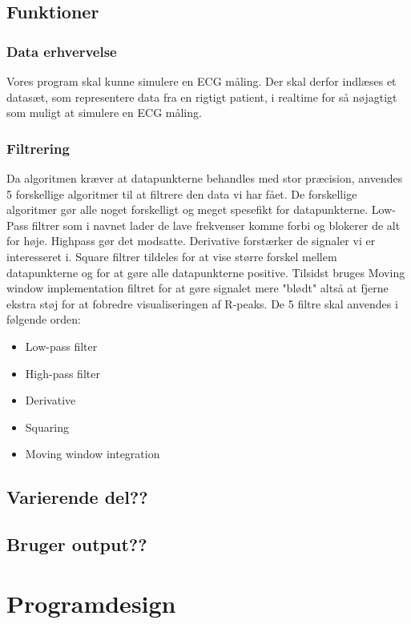 \documentclass[a4paper,12pt]{article}
\begin{document}
\subsection{Funktioner}
\subsubsection{Data erhvervelse}
Vores program skal kunne simulere en ECG måling. Der skal derfor indlæses et datasæt, som representere data fra en rigtigt patient, i realtime for så nøjagtigt som muligt at simulere en ECG måling.  
\subsubsection{Filtrering}
Da algoritmen kræver at datapunkterne behandles med stor præcision, anvendes 5 forskellige algoritmer til at filtrere den data vi har fået. De forskellige algoritmer gør alle noget forskelligt og meget spesefikt for datapunkterne. Low-Pass filtrer som i navnet lader de lave frekvenser komme forbi og blokerer de alt for høje. Highpass gør det modsatte. Derivative forstærker de signaler vi er interesseret i. Square filtrer tildeles for at vise større forskel mellem datapunkterne og for at gøre alle datapunkterne positive. Tilsidst bruges Moving window implementation filtret for at gøre signalet mere "blødt" altså at fjerne ekstra støj for at fobredre visualiseringen af R-peaks. De 5 filtre skal anvendes i følgende orden:
\begin{itemize}
\item Low-pass filter
\item High-pass filter
\item Derivative
\item Squaring
\item Moving window integration
\end{itemize}
\subsection{Varierende del??}
\subsection{Bruger output??}
\section{Programdesign}
\end{document}
